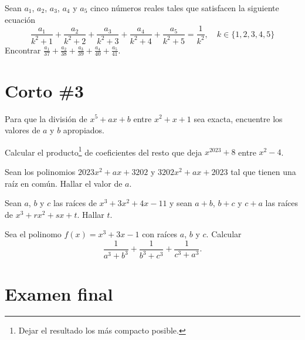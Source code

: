 \begin{section-problem}
    Sean $a_1$, $a_2$, $a_3$, $a_4$ y $a_5$ cinco números reales tales que satisfacen la siguiente ecuación
    \[\frac{a_1}{k^2 + 1} + \frac{a_2}{k^2 + 2} + \frac{a_3}{k^2 + 3} + \frac{a_4}{k^2 + 4} + \frac{a_5}{k^2 + 5} = \frac{1}{k^2}, \quad k \in \{1, 2, 3, 4, 5\}\]
    Encontrar $\frac{a_1}{37} + \frac{a_2}{38} + \frac{a_3}{39} + \frac{a_4}{40} + \frac{a_5}{41}$.
\end{section-problem}


\section{Corto \#3}

    \begin{section-problem}
        Para que la división de $x^5 + ax + b$ entre $x^2 + x + 1$ sea exacta, encuentre los valores de $a$ y $b$ apropiados.
    \end{section-problem}

    \begin{section-problem}
        Calcular el producto\footnote{Dejar el resultado los más compacto posible.} de coeficientes del resto que deja $x^{2023} + 8$ entre $x^2 - 4$.
    \end{section-problem}

    \begin{section-problem}
        Sean los polinomios $2023x^2 + ax + 3202$ y $3202x^2 + ax + 2023$ tal que tienen una raíz en común.
        Hallar el valor de $a$.
    \end{section-problem}

    \begin{section-problem}
        Sean $a$, $b$ y $c$ las raíces de $x^3 + 3x^2 + 4x - 11$ y sean $a + b$, $b + c$ y $c + a$ las raíces de $x^3 + rx^2 + sx + t$.
        Hallar $t$.
    \end{section-problem}

    \begin{section-problem}
        Sea el polinomo $f(x) = x^3 + 3x - 1$ con raíces $a$, $b$ y $c$.
        Calcular
        \[\frac{1}{a^3 + b^3} + \frac{1}{b^3 + c^3} + \frac{1}{c^3 + a^3}.\]
    \end{section-problem}

\section{Examen final}

